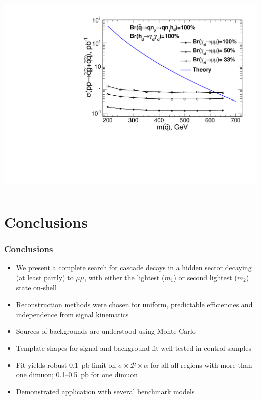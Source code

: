 \documentclass[compress]{beamer}
\begin{document}
\begin{frame}
\begin{columns}
\includegraphics[width=\linewidth]{ulimit_model1.pdf}
\end{columns}
\end{frame}

\section*{Conclusions}

\begin{frame}
\frametitle{Conclusions}

\begin{itemize}\setlength{\itemsep}{0.4 cm}
\item We present a complete search for cascade decays in a hidden
  sector decaying (at least partly) to $\mu\mu$, with either the
  lightest ($m_1$) or second lightest ($m_2$) state on-shell

\item Reconstruction methods were chosen for uniform, predictable
  efficiencies and independence from signal kinematics

\item Sources of backgrounds are understood using Monte Carlo

\item Template shapes for signal and background fit well-tested in
  control samples

\item Fit yields robust 0.1~pb limit on $\sigma \times \mathcal{B}
  \times \alpha$ for all all regions with more than one dimuon;
  0.1--0.5~pb for one dimuon

\item Demonstrated application with several benchmark models
\end{itemize}

\label{numpages}
\end{frame}
\end{document}
